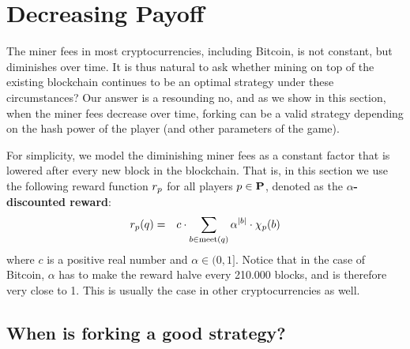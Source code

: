
\section{Decreasing Payoff}
\label{sec-dec}


The miner fees in most cryptocurrencies, including Bitcoin, is not constant, but diminishes over time. 
It is thus natural to ask whether mining on top of the existing blockchain continues to be an optimal strategy under these 
circumstances? Our answer is a resounding no, and as we show in this section, when the miner fees decrease over time, forking can be a valid strategy depending on the hash power of the player (and other parameters of the game). 

For simplicity, we model the diminishing miner fees as a constant factor that is lowered after every new block in the blockchain. That is, in this section 
we use the following reward function $r_p$ for all players $p \in \mathbf{P}$, denoted as the \textbf{$\alpha$-discounted reward}: 
\begin{eqnarray*}
r_p(q) & = & 
{\displaystyle c \cdot \sum_{b \in \text{\rm meet}(q)} \alpha^{|b|} \cdot \chi_p(b)} \end{eqnarray*}
where $c$ is a positive real number and $\alpha \in (0,1]$. Notice that in the case of Bitcoin, $\alpha$ has to make the reward halve every 210.000 blocks, and is therefore very close to 1. This is usually the case in other cryptocurrencies as well. 

%

\subsection{When is forking a good strategy?}
\label{sec-forkingstrategies}

